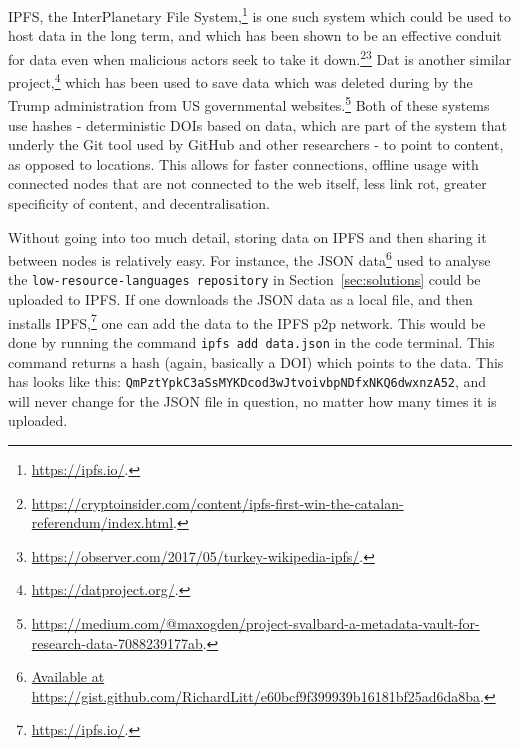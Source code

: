 IPFS, the InterPlanetary File System,\footnote{\href{https://ipfs.io/}{https://ipfs.io/}. } is one such system which could be used to host data in the long term, and which has been shown to be an effective conduit for data even when malicious actors seek to take it down.\footnote{\href{https://cryptoinsider.com/content/ipfs-first-win-the-catalan-referendum/index.html}{https://cryptoinsider.com/content/ipfs-first-win-the-catalan-referendum/index.html}. }\footnote{\href{https://observer.com/2017/05/turkey-wikipedia-ipfs/}{https://observer.com/2017/05/turkey-wikipedia-ipfs/}. } Dat is another similar project,\footnote{\href{https://datproject.org/}{https://datproject.org/}. } which has been used to save data which was deleted during by the Trump administration from US governmental websites.\footnote{\href{https://medium.com/@maxogden/project-svalbard-a-metadata-vault-for-research-data-7088239177ab}{https://medium.com/@maxogden/project-svalbard-a-metadata-vault-for-research-data-7088239177ab}. } Both of these systems use hashes - deterministic DOIs based on data, which are part of the system that underly the Git tool used by GitHub and other researchers - to point to content, as opposed to locations. This allows for faster connections, offline usage with connected nodes that are not connected to the web itself, less link rot, greater specificity of content, and decentralisation.

Without going into too much detail, storing data on IPFS and then sharing it between nodes is relatively easy. For instance, the JSON data\footnote{\href{https://gist.github.com/RichardLitt/e60bcf9f399939b16181bf25ad6da8ba}{Available at https://gist.github.com/RichardLitt/e60bcf9f399939b16181bf25ad6da8ba}. } used to analyse the {\tt low-resource-languages repository} in Section~\ref{sec:solutions} could be uploaded to IPFS. If one downloads the JSON data as a local file, and then installs IPFS,\footnote{\href{https://ipfs.io/}{https://ipfs.io/}. } one can add the data to the IPFS p2p network. This would be done by running the command {\tt ipfs add data.json} in the code terminal. This command returns a hash (again, basically a DOI) which points to the data. This has looks like this: {\tt QmPztYpkC3aSs\-MYKDcod\-3wJtvoivbp\-NDfxNKQ6dwxnzA52}, and will never change for the JSON file in question, no matter how many times it is uploaded.

